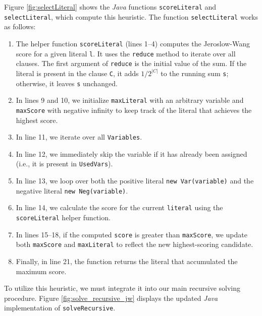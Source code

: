 Figure \ref{fig:selectLiteral} shows the \textsl{Java} functions
\texttt{scoreLiteral} and \texttt{selectLiteral}, which compute this heuristic.  The function \texttt{selectLiteral} works as follows:
\begin{enumerate}
\item The helper function \texttt{scoreLiteral} (lines 1--4) computes the Jeroslow-Wang score for a given
  literal \texttt{l}. It uses the \texttt{reduce} method to iterate over all clauses. The first argument of
  \texttt{reduce} is the initial value of the sum.  If the literal is present
  in the clause \texttt{C}, it adds $1 / 2^{|C|}$ to the running sum \texttt{s}; otherwise, it leaves
  \texttt{s} unchanged. 
\item In lines 9 and 10, we initialize \texttt{maxLiteral} with an arbitrary variable and \texttt{maxScore}
  with negative infinity to keep track of the literal that achieves the highest score. 
\item In line 11, we iterate over all \texttt{Variables}.
\item In line 12, we immediately skip the variable if it has already been assigned (i.e., it is present in
  \texttt{UsedVars}). 
\item In line 13, we loop over both the positive literal \texttt{new Var(variable)} and the negative literal
  \texttt{new Neg(variable)}. 
\item In line 14, we calculate the score for the current \texttt{literal} using the \texttt{scoreLiteral}
  helper function. 
\item In lines 15--18, if the computed \texttt{score} is greater than \texttt{maxScore}, we update both
  \texttt{maxScore} and \texttt{maxLiteral} to reflect the new highest-scoring candidate. 
\item Finally, in line 21, the function returns the literal that accumulated the maximum score. 
\end{enumerate}

\FloatBarrier

To utilize this heuristic, we must integrate it into our main recursive solving procedure. Figure
\ref{fig:solve_recursive_jw} displays the updated \textsl{Java} implementation of
\texttt{solveRecursive}. 

